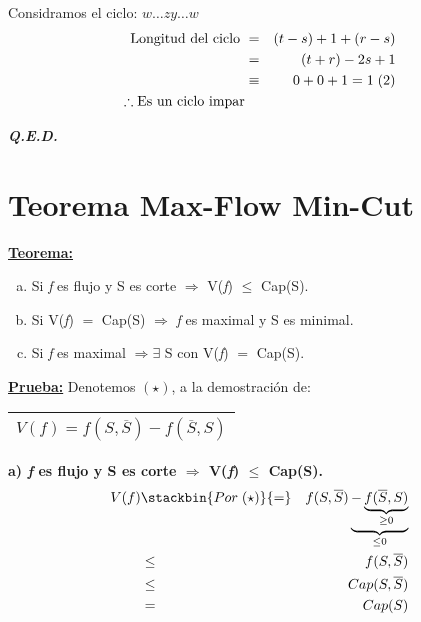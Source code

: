 \documentclass[12pt,a4paper]{report}
\newcommand{\QED}{\hfill \textit{\textbf{Q.E.D.}}}
\begin{document}
\begin{itemize}
\begin{itemize}
						\par Considramos el ciclo: $w \dotsc z y \dotsc w$
						\begin{eqnarray}
							\nonumber \textup{Longitud del ciclo } &=& (t - s) + 1 + (r - s) \\
							\nonumber &=& (t+r) - 2s + 1 \\
							\nonumber &\equiv & 0 + 0 + 1 = 1 \; (2) \\
							\nonumber \therefore \textup{Es un ciclo impar}
						\end{eqnarray}
					\end{itemize}
			\end{itemize}

		\QED

	\section{Teorema Max-Flow Min-Cut}
		\textbf{\underline{Teorema:}}
			\begin{enumerate}[a)]
				\item Si \textit{f} es flujo y S es corte $\Rightarrow$ V(\textit{f}) $\leq$ Cap(S).
				\item Si V(\textit{f}) $=$ Cap(S) $\Rightarrow$ \textit{f} es maximal y S es minimal.
				\item Si \textit{f} es maximal $\Rightarrow \exists$ S con V(\textit{f}) $=$ Cap(S).
			\end{enumerate}

		\textbf{\underline{Prueba:}} Denotemos $(\star)$, a la demostración de:
			\begin{center}
				\begin{tabular}{|c|} \hline $V(\textit{f}) = f(S, \overline{S}) - f(\overline{S},S)$ \\\hline \end{tabular}
			\end{center}

			\vspace{5mm}
			\textbf{a) \textit{f} es flujo y S es corte $\Rightarrow$ V(\textit{f}) $\leq$ Cap(S).}
				\begin{eqnarray}
					\nonumber V(f) &\stackbin{Por \; (\star)}{=}& f(S, \overline{S})\underbrace{-\underbrace{f(\overline{S}, S)}_{\geq 0}}_{\leq 0} \\
					\nonumber &\leq & f(S, \overline{S}) \\
					\nonumber &\leq & Cap(S, \overline{S}) \\
					\nonumber &=& Cap(S)
				\end{eqnarray}
\end{document}
